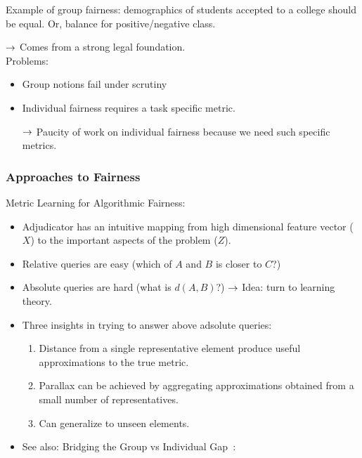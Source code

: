 Example of group fairness: demographics of students accepted to a college should be equal. Or, balance for positive/negative class.\\



$\rightarrow$ Comes from a strong legal foundation.\\


Problems:
\begin{itemize}
    \item Group notions fail under scrutiny
    \item Individual fairness requires a task specific metric.
    
    $\rightarrow$ Paucity of work on individual fairness because we need such specific metrics.
\end{itemize}


\subsubsection{Approaches to Fairness}

Metric Learning for Algorithmic Fairness:
\begin{itemize}
    \item Adjudicator has an intuitive mapping from high dimensional feature vector ($X$) to the important aspects of the problem ($Z$).
    \item Relative queries are easy (which of $A$ and $B$ is closer to $C$?)
    \item Absolute queries are hard (what is $d(A,B)$?)
    $\rightarrow$ Idea: turn to learning theory.
    \item Three insights in trying to answer above adsolute queries:
    \begin{enumerate}
        \item Distance from a single representative element produce useful approximations to the true metric.
        \item Parallax can be achieved by aggregating approximations obtained from a small number of representatives.
        \item Can generalize to unseen elements.
    \end{enumerate}
    \item See also: Bridging the Group vs Individual Gap~\cite{hebert2018multicalibration,kim2018fairness}:
\end{itemize}


